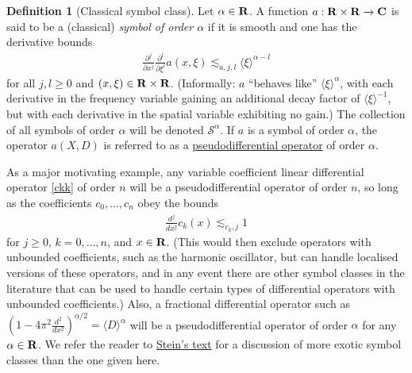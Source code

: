 \documentclass[11pt]{article}
\theoremstyle{definition}
\newtheorem{definition}[theorem]{Definition}
\begin{document}
\begin{definition}[Classical symbol class]
 \label{symb} Let \({\alpha \in {\bf R}}\). A function \({a: {\bf R} \times {\bf R} \rightarrow {\bf C}}\) is said to be a (classical) \emph{symbol of order \({\alpha}\)} if it is smooth and one has the derivative bounds 
\begin{align}\label{class-symb}
  \frac{\partial^j}{\partial x^j} \frac{\partial^l}{\partial \xi^l} a(x,\xi) \lesssim_{a,j,l} \langle \xi \rangle^{\alpha - l} 
\end{align}
 for all \({j,l \geq 0}\) and \({(x,\xi) \in {\bf R} \times {\bf R}}\). (Informally: \({a}\) “behaves like” \({\langle \xi \rangle^\alpha}\), with each derivative in the frequency variable gaining an additional decay factor of \({\langle \xi \rangle^{-1}}\), but with each derivative in the spatial variable exhibiting no gain.) The collection of all symbols of order \({\alpha}\) will be denoted \({{\mathcal S}^\alpha}\). If \({a}\) is a symbol of order \({\alpha}\), the operator \({a(X,D)}\) is referred to as a \href{https://en.wikipedia.org/wiki/Pseudo-differential_operator}{pseudodifferential operator} of order \({\alpha}\). 
\end{definition}

As a major motivating example, any variable coefficient linear differential operator \eqref{ckk} of order \({n}\) will be a pseudodifferential operator of order \({n}\), so long as the coefficients \({c_0,\dots,c_n}\) obey the bounds 
\begin{align}\label{cb}
  \frac{d^j}{d x^j} c_k(x) \lesssim_{c_k, j} 1 
\end{align}
 for \({j \geq 0}\), \({k=0,\dots,n}\), and \({x \in {\bf R}}\). (This would then exclude operators with unbounded coefficients, such as the harmonic oscillator, but can handle localised versions of these operators, and in any event there are other symbol classes in the literature that can be used to handle certain types of differential operators with unbounded coefficients.) Also, a fractional differential operator such as \({(1 - 4\pi^2 \frac{d^2}{dx^2})^{\alpha/2} = \langle D \rangle^\alpha}\) will be a pseudodifferential operator of order \({\alpha}\) for any \({\alpha \in {\bf R}}\). We refer the reader to \href{https://mathscinet.ams.org/mathscinet-getitem?mr=1232192}{Stein’s text} for a discussion of more exotic symbol classes than the one given here.
\end{document}

